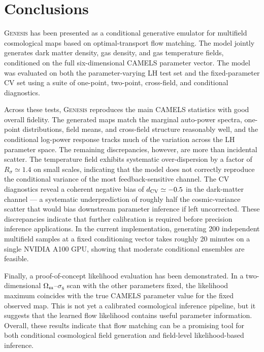 \documentclass[usenatbib]{mnras}
\newcommand{\Om}{\Omega_{\rm m}}
\newcommand{\sig}{\sigma_8}
\begin{document}
\section{Conclusions}
\label{sec:conclusions}

\textsc{Genesis} has been presented as a conditional generative emulator
for multifield cosmological maps based on optimal-transport flow
matching. The model jointly generates dark matter density,
gas density, and gas temperature fields, conditioned on the full
six-dimensional CAMELS parameter vector. The model was evaluated on
both the parameter-varying LH test set and the fixed-parameter CV set
using a suite of one-point, two-point, cross-field, and conditional
diagnostics.

Across these tests, \textsc{Genesis} reproduces the main CAMELS
statistics with good overall fidelity. The generated maps match the marginal
auto-power spectra, one-point distributions, field means, and
cross-field structure reasonably well, and the conditional log-power
response tracks much of the variation across the LH parameter space.
The remaining discrepancies, however, are more than incidental scatter.
The temperature field exhibits systematic over-dispersion by a factor of
$R_\sigma \simeq 1.4$ on small scales, indicating that the model does not
correctly reproduce the conditional variance of the most
feedback-sensitive channel. The CV diagnostics reveal a coherent negative
bias of $d_{\rm CV}\simeq -0.5$ in the dark-matter channel --- a
systematic underprediction of roughly half the cosmic-variance scatter
that would bias downstream parameter inference if left uncorrected.
These discrepancies indicate that further calibration is required
before precision inference applications. In the current implementation,
generating 200 independent multifield samples at a fixed conditioning
vector takes roughly 20 minutes on a single NVIDIA A100 GPU, showing
that moderate conditional ensembles are feasible.

Finally, a proof-of-concept likelihood evaluation has been demonstrated.
In a two-dimensional $\Om$--$\sig$ scan with the other parameters fixed,
the likelihood maximum coincides with the true CAMELS parameter value
for the fixed observed map. This is not yet a calibrated cosmological
inference pipeline, but it suggests that the learned flow likelihood
contains useful parameter information. Overall, these results indicate
that flow matching can be a promising tool for both conditional
cosmological field generation and field-level likelihood-based
inference.
\end{document}
